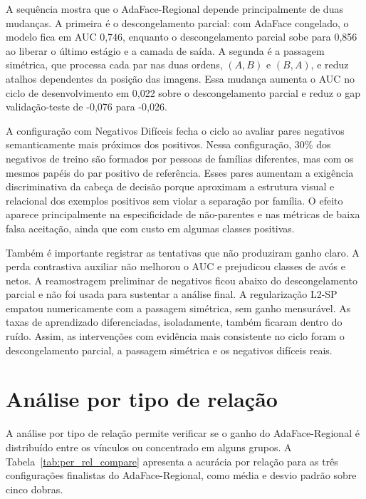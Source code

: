 A sequência mostra que o AdaFace-Regional depende principalmente de duas mudanças. A primeira é o descongelamento parcial: com AdaFace congelado, o modelo fica em AUC 0,746, enquanto o descongelamento parcial sobe para 0,856 ao liberar o último estágio e a camada de saída. A segunda é a passagem simétrica, que processa cada par nas duas ordens, $(A,B)$ e $(B,A)$, e reduz atalhos dependentes da posição das imagens. Essa mudança aumenta o AUC no ciclo de desenvolvimento em 0,022 sobre o descongelamento parcial e reduz o gap validação-teste de -0,076 para -0,026.

A configuração com Negativos Difíceis fecha o ciclo ao avaliar pares negativos semanticamente mais próximos dos positivos. Nessa configuração, 30\% dos negativos de treino são formados por pessoas de famílias diferentes, mas com os mesmos papéis do par positivo de referência. Esses pares aumentam a exigência discriminativa da cabeça de decisão porque aproximam a estrutura visual e relacional dos exemplos positivos sem violar a separação por família. O efeito aparece principalmente na especificidade de não-parentes e nas métricas de baixa falsa aceitação, ainda que com custo em algumas classes positivas.

Também é importante registrar as tentativas que não produziram ganho claro. A perda contrastiva auxiliar não melhorou o AUC e prejudicou classes de avós e netos. A reamostragem preliminar de negativos ficou abaixo do descongelamento parcial e não foi usada para sustentar a análise final. A regularização L2-SP empatou numericamente com a passagem simétrica, sem ganho mensurável. As taxas de aprendizado diferenciadas, isoladamente, também ficaram dentro do ruído. Assim, as intervenções com evidência mais consistente no ciclo foram o descongelamento parcial, a passagem simétrica e os negativos difíceis reais.

\section{Análise por tipo de relação}

A análise por tipo de relação permite verificar se o ganho do AdaFace-Regional é distribuído entre os vínculos ou concentrado em alguns grupos. A Tabela~\ref{tab:per_rel_compare} apresenta a acurácia por relação para as três configurações finalistas do AdaFace-Regional, como média e desvio padrão sobre cinco dobras.

